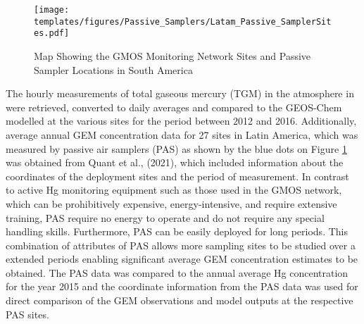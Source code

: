 \begin{table}[H]
\label{tab:ASGM_at_GMOS_annual_avs}

\centering
{}

\end{table}
\begin{figure}[H]
 \centering
  \texttt{[image: templates/figures/Passive\_Samplers/Latam\_Passive\_SamplerSites.pdf]}
  \caption{Map Showing the GMOS Monitoring Network Sites and Passive Sampler Locations in South America}
  \label{fig:GMOS_PAS_stations_map}
 
  
\end{figure}
\FloatBarrier

\begin{flushleft}
The hourly measurements of total gaseous mercury (TGM) in the atmosphere in \nang were retrieved, converted to daily averages and compared to the GEOS-Chem modelled \hg at the various sites for the period between 2012 and 2016. Additionally, average annual GEM concentration data for 27 sites in Latin America, which was measured by passive air samplers (PAS) as shown by the blue dots on Figure  \ref{fig:GMOS_PAS_stations_map} was obtained from Quant et al., (2021), which included information about the coordinates of the deployment sites and the period of measurement\cite{quant_measuring_2021}. In contrast to active Hg monitoring equipment such as those used in the GMOS network, which can be prohibitively expensive, energy-intensive, and require extensive training, PAS require no energy to operate and do not require any special handling skills. Furthermore, PAS can be easily deployed for long periods. This combination of attributes of PAS allows more sampling sites to be studied over a extended periods enabling significant average GEM concentration estimates to be obtained. The PAS data was compared to the annual average Hg concentration for the year 2015 and the coordinate information from the PAS data was used for direct comparison of the GEM observations and model outputs at the respective PAS sites.
\end{flushleft}


